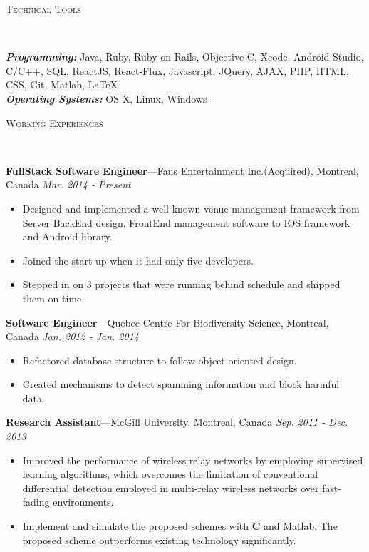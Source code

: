 \documentclass[11pt]{article}
\newenvironment{changemargin}[2]{%
  \begin{list}{}{%
    \setlength{\topsep}{0pt}%
    \setlength{\leftmargin}{#1}%
    \setlength{\rightmargin}{#2}%
    \setlength{\listparindent}{\parindent}%
    \setlength{\itemindent}{\parindent}%
    \setlength{\parsep}{\parskip}%
  }%
  \item[]}{\end{list}
}
\newcommand{\lineover}{
	\begin{changemargin}{-0.05in}{-0.05in}
		\vspace*{-8pt}
		\hrulefill \\
		\vspace*{-2pt}
	\end{changemargin}
}
\newcommand{\header}[1]{
	\begin{changemargin}{-0.5in}{-0.5in}
		\scshape{#1}\\
  	\lineover
	\end{changemargin}
}
\newenvironment{body} {
	\vspace*{-16pt}
	\begin{changemargin}{-0.25in}{-0.5in}
  }	
	{\end{changemargin}
}
\begin{document}
\header{Technical Tools}
\begin{body}
	\vspace{14pt}
	\emph{\textbf{Programming:}}{} Java, Ruby, Ruby on Rails, Objective C, Xcode, Android Studio, C/C++, SQL, ReactJS, React-Flux, Javascript, JQuery, AJAX, PHP, HTML, CSS, Git, Matlab, \LaTeX\\
\medskip
	\emph{\textbf{Operating Systems:}}{} OS X, Linux, Windows\\
\end{body}
\smallskip
\header{Working Experiences}
\begin{body}
	\vspace{14pt}
	\textbf{FullStack Software Engineer}---Fans Entertainment Inc.(Acquired), Montreal, Canada  \hfill \emph{Mar. 2014 - Present}\\
	\begin{itemize} \itemsep -0pt  %
		\item Designed and implemented a well-known venue management framework from Server BackEnd design, FrontEnd management software to IOS framework and Android library.
		\item Joined the start-up when it had only five developers.
		\item Stepped in on 3 projects that were running behind schedule and shipped them on-time.
	\end{itemize}

	\textbf{Software Engineer}---Quebec Centre For Biodiversity Science, Montreal, Canada  \hfill \emph{Jan. 2012 - Jan. 2014}\\
	\begin{itemize} \itemsep -0pt  %
		\item Refactored database structure to follow object-oriented design.
		\item Created mechanisms to detect spamming information and block harmful data.
	\end{itemize}	
	
	\textbf{Research Assistant}---McGill University, Montreal, Canada  \hfill \emph{Sep. 2011 - Dec. 2013}\\
	\vspace*{-4pt}
	\begin{itemize} \itemsep -0pt  %
\item Improved the performance of wireless relay networks by employing supervised learning algorithms, which overcomes the limitation of conventional differential detection employed in multi-relay wireless networks over fast-fading environments.
\item Implement and simulate the proposed schemes with \textbf{C} and Matlab. The proposed scheme outperforms existing technology significantly.
	\end{itemize}
	

\end{body}
\end{document}
